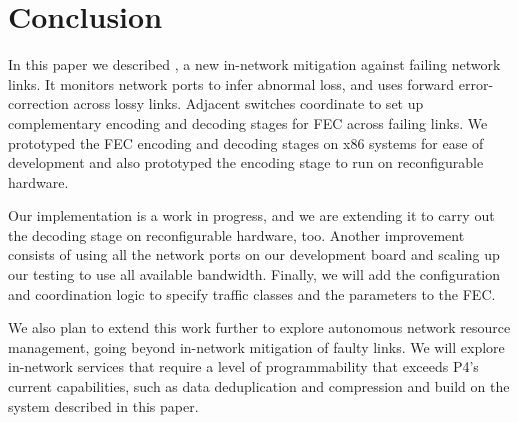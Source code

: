 \section{Conclusion}
In this paper we described \OurSys, a new in-network mitigation
against failing network links. It monitors network ports to infer
abnormal loss, and uses forward error-correction across lossy links.
Adjacent switches coordinate to set up complementary encoding and
decoding stages for FEC across failing links.  We prototyped the FEC
encoding and decoding stages on x86 systems for ease of development
and also prototyped the encoding stage to run on reconfigurable
hardware.

Our implementation is a work in progress, and we are extending it to
carry out the decoding stage on reconfigurable hardware, too.
Another improvement consists of using all the network ports on our
development board and scaling up our testing to use all available
bandwidth.
Finally, we will add the configuration and coordination logic to
specify traffic classes and the parameters to the FEC.

We also plan to extend this work further to explore autonomous
network resource management, going beyond in-network mitigation of
faulty links. We will explore in-network services that require
a level of programmability that exceeds P4's current capabilities,
such as data deduplication and compression and build on the system
described in this paper.
